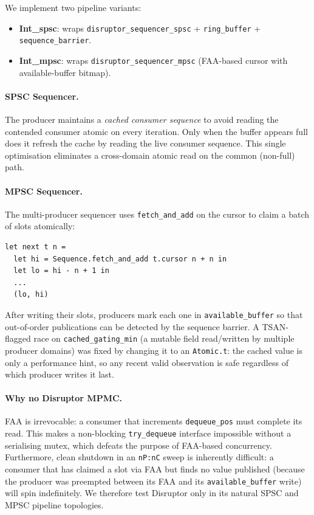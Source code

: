 \documentclass[11pt,a4paper]{article}
\begin{document}
We implement two pipeline variants:
\begin{itemize}[noitemsep]
  \item \textbf{Int\_spsc}: wraps \texttt{disruptor\_sequencer\_spsc} + \texttt{ring\_buffer} + \texttt{sequence\_barrier}.
  \item \textbf{Int\_mpsc}: wraps \texttt{disruptor\_sequencer\_mpsc} (FAA-based cursor with available-buffer bitmap).
\end{itemize}

\paragraph{SPSC Sequencer.}
The producer maintains a \emph{cached consumer sequence} to avoid reading the contended
consumer atomic on every iteration. Only when the buffer appears full does it refresh
the cache by reading the live consumer sequence. This single optimisation eliminates a
cross-domain atomic read on the common (non-full) path.

\paragraph{MPSC Sequencer.}
The multi-producer sequencer uses \texttt{fetch\_and\_add} on the cursor to claim a
batch of slots atomically:
\begin{lstlisting}[caption={FAA-based batch claim in the MPSC Disruptor sequencer.}]
let next t n =
  let hi = Sequence.fetch_and_add t.cursor n + n in
  let lo = hi - n + 1 in
  ...
  (lo, hi)
\end{lstlisting}
After writing their slots, producers mark each one in \texttt{available\_buffer} so
that out-of-order publications can be detected by the sequence barrier. A TSAN-flagged
race on \texttt{cached\_gating\_min} (a mutable field read/written by multiple producer
domains) was fixed by changing it to an \texttt{Atomic.t}: the cached value is only a
performance hint, so any recent valid observation is safe regardless of which producer
writes it last.

\paragraph{Why no Disruptor MPMC.}
FAA is irrevocable: a consumer that increments \texttt{dequeue\_pos} must complete its
read. This makes a non-blocking \texttt{try\_dequeue} interface impossible without a
serialising mutex, which defeats the purpose of FAA-based concurrency.
Furthermore, clean shutdown in an \texttt{nP:nC} sweep is inherently difficult:
a consumer that has claimed a slot via FAA but finds no value published (because the
producer was preempted between its FAA and its \texttt{available\_buffer} write) will
spin indefinitely. We therefore test Disruptor only in its natural SPSC and MPSC
pipeline topologies.
\end{document}

